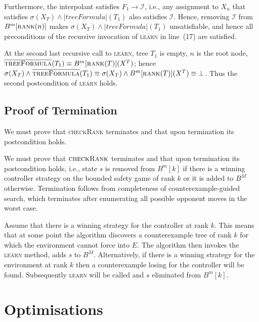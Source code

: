 \documentclass{llncs}
\newcommand{\II}{\mathcal{I}}
\newcommand{\textoverline}[1]{$\overline{\mbox{#1}}$}
\begin{document}
Furthermore, the interpolant satisfies $F_1 \rightarrow \II$, i.e., any
assignment to $X_n$ that satisfies $\sigma(X_T) \land |treeFormula|(T_1)$ also
satisfies $\II$.  Hence, removing $\II$ from $B^m[\textsc{rank}(n)]$ makes
$\sigma(X_T) \land |treeFormula|(T_1)$ unsatisfiable, and hence all
preconditions of the recursive invocation of \textsc{\textoverline{learn}} in
line~(17) are satisfied.  

At the second last recursive call to \textsc{\textoverline{learn}}, tree $T_1$
is empty, $n$ is the root node, $\textsc{\textoverline{treeFormula}}(T_1)
\equiv B^m[\textsc{rank}(T)](X^T)$; hence $\sigma(X_T) \land
\textsc{\textoverline{treeFormula}}(T_1) \equiv \sigma(X_T) \land
B^m[\textsc{rank}(T)](X^T) \equiv \bot$.  Thus the second postcondition of
\textsc{\textoverline{learn}} holds.

\subsection{Proof of Termination}

We must prove that \textsc{checkRank} terminates and that upon termination its
postcondition holds.

We must prove that $\textsc{checkRank}$ terminates and that upon termination
its postcondition holds, i.e., state $s$ is removed from $B^m[k]$ if there is a
winning controller strategy on the bounded safety game of rank $k$ or it is
added to $B^M$ otherwise. Termination follows from completeness of
counterexample-guided search, which terminates after enumerating all possible
opponent moves in the worst case.

Assume that there is a winning strategy for the controller at rank $k$. This
means that at some point the algorithm discovers a counterexample tree of rank
$k$ for which the environment cannot force into $E$. The algorithm then invokes
the \textsc{\textoverline{learn}} method, adds $s$ to $B^M$.  Alternatively, if
there is a winning strategy for the environment at rank $k$ then a
counterexample losing for the controller will be found. Subsequently
\textsc{learn} will be called and $s$ eliminated from $B^m[k]$.

\section{Optimisations}

\end{document}
